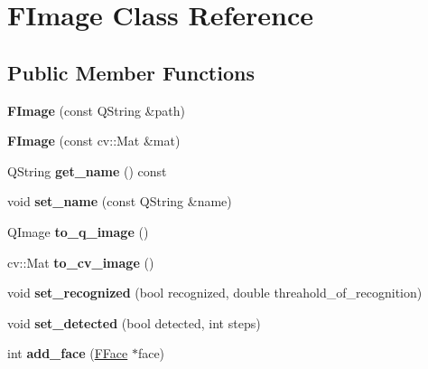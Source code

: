 \hypertarget{classFImage}{}\section{F\+Image Class Reference}
\label{classFImage}
\subsection*{Public Member Functions}
\begin{DoxyCompactItemize}
\item 
\mbox{\label{classFImage_ab0b48ac01caee473e5e4363274f4e166}} 
{\bfseries F\+Image} (const Q\+String \&path)
\item 
\mbox{\label{classFImage_abd1c56744d46d6d7cc559d902532f9e2}} 
{\bfseries F\+Image} (const cv\+::\+Mat \&mat)
\item 
\mbox{\label{classFImage_a5769ad6633c2f37fb5f13c4b552bb8ed}} 
Q\+String {\bfseries get\+\_\+name} () const
\item 
\mbox{\label{classFImage_ac14200c10a9a112ee92792c2958ec710}} 
void {\bfseries set\+\_\+name} (const Q\+String \&name)
\item 
\mbox{\label{classFImage_a82cab8d4bf02ed4e316bcbafd7503bb6}} 
Q\+Image {\bfseries to\+\_\+q\+\_\+image} ()
\item 
\mbox{\label{classFImage_ac20f0314cc27a646f7c051ed30521791}} 
cv\+::\+Mat {\bfseries to\+\_\+cv\+\_\+image} ()
\item 
\mbox{\label{classFImage_a6ddf652e7426034db1928ab6f712ffe1}} 
void {\bfseries set\+\_\+recognized} (bool recognized, double threahold\+\_\+of\+\_\+recognition)
\item 
\mbox{\label{classFImage_a552d285fc2e3af631a62f0919a445c62}} 
void {\bfseries set\+\_\+detected} (bool detected, int steps)
\item 
\mbox{\label{classFImage_a9df7dccbbfedc6fcd0d9277b9d84da04}} 
int {\bfseries add\+\_\+face} (\hyperlink{classFFace}{F\+Face} $\ast$face)
\item 

\end{DoxyCompactItemize}
